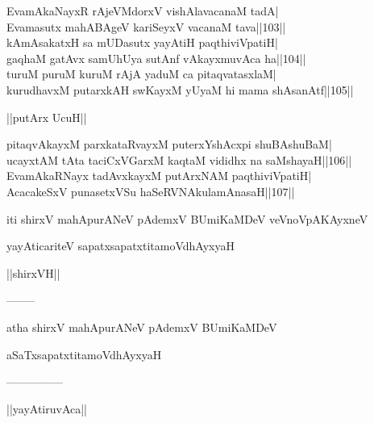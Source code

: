 \documentclass{article}
\begin{document}
EvamAkaNayxR rAjeVMdorxV vishAlavacanaM tadA|\\
Evamasutx mahABAgeV kariSeyxV vacanaM tava||103||\\
kAmAsakatxH sa mUDasutx yayAtiH paqthiviVpatiH|\\
gaqhaM gatAvx samUhUya sutAnf vAkayxmuvAca ha||104||\\
turuM puruM kuruM rAjA yaduM ca pitaqvatasxlaM|\\
kurudhavxM putarxkAH swKayxM yUyaM hi mama shAsanAtf||105||\\

\begin{center}
||putArx UcuH||
\end{center}

pitaqvAkayxM parxkataRvayxM puterxYshAcxpi shuBAshuBaM|\\
ucayxtAM tAta taciCxVGarxM kaqtaM vididhx na saMshayaH||106||\\
EvamAkaRNayx tadAvxkayxM putArxNAM paqthiviVpatiH|\\
AcacakeSxV punasetxVSu haSeRVNAkulamAnasaH||107||

\begin{center}
iti shirxV mahApurANeV pAdemxV BUmiKaMDeV veVnoVpAKAyxneV
\end{center}

\begin{center}
yayAticariteV sapatxsapatxtitamoVdhAyxyaH
\end{center}

\begin{center}
||shirxVH||
\end{center}

\begin{center}
--------
\end{center}

\begin{center}
atha shirxV mahApurANeV pAdemxV BUmiKaMDeV
\end{center}

\begin{center}
aSaTxsapatxtitamoVdhAyxyaH
\end{center}

\begin{center}

---------------
\end{center}

\begin{center}
||yayAtiruvAca||
\end{center}
\end{document}
